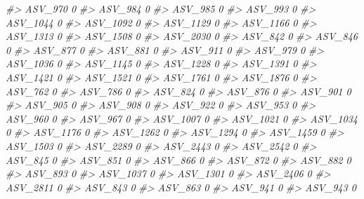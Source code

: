 \documentclass[
]{article}
\newenvironment{Shaded}{\begin{snugshade}}{\end{snugshade}}
\newcommand{\CommentTok}[1]{\textcolor[rgb]{0.56,0.35,0.01}{\textit{#1}}}
\begin{document}
\begin{Shaded}
\begin{Highlighting}[]
\CommentTok{\#\textgreater{} ASV\_970   0}
\CommentTok{\#\textgreater{} ASV\_984   0}
\CommentTok{\#\textgreater{} ASV\_985   0}
\CommentTok{\#\textgreater{} ASV\_993   0}
\CommentTok{\#\textgreater{} ASV\_1044  0}
\CommentTok{\#\textgreater{} ASV\_1092  0}
\CommentTok{\#\textgreater{} ASV\_1129  0}
\CommentTok{\#\textgreater{} ASV\_1166  0}
\CommentTok{\#\textgreater{} ASV\_1313  0}
\CommentTok{\#\textgreater{} ASV\_1508  0}
\CommentTok{\#\textgreater{} ASV\_2030  0}
\CommentTok{\#\textgreater{} ASV\_842   0}
\CommentTok{\#\textgreater{} ASV\_846   0}
\CommentTok{\#\textgreater{} ASV\_877   0}
\CommentTok{\#\textgreater{} ASV\_881   0}
\CommentTok{\#\textgreater{} ASV\_911   0}
\CommentTok{\#\textgreater{} ASV\_979   0}
\CommentTok{\#\textgreater{} ASV\_1036  0}
\CommentTok{\#\textgreater{} ASV\_1145  0}
\CommentTok{\#\textgreater{} ASV\_1228  0}
\CommentTok{\#\textgreater{} ASV\_1391  0}
\CommentTok{\#\textgreater{} ASV\_1421  0}
\CommentTok{\#\textgreater{} ASV\_1521  0}
\CommentTok{\#\textgreater{} ASV\_1761  0}
\CommentTok{\#\textgreater{} ASV\_1876  0}
\CommentTok{\#\textgreater{} ASV\_762   0}
\CommentTok{\#\textgreater{} ASV\_786   0}
\CommentTok{\#\textgreater{} ASV\_824   0}
\CommentTok{\#\textgreater{} ASV\_876   0}
\CommentTok{\#\textgreater{} ASV\_901   0}
\CommentTok{\#\textgreater{} ASV\_905   0}
\CommentTok{\#\textgreater{} ASV\_908   0}
\CommentTok{\#\textgreater{} ASV\_922   0}
\CommentTok{\#\textgreater{} ASV\_953   0}
\CommentTok{\#\textgreater{} ASV\_960   0}
\CommentTok{\#\textgreater{} ASV\_967   0}
\CommentTok{\#\textgreater{} ASV\_1007  0}
\CommentTok{\#\textgreater{} ASV\_1021  0}
\CommentTok{\#\textgreater{} ASV\_1034  0}
\CommentTok{\#\textgreater{} ASV\_1176  0}
\CommentTok{\#\textgreater{} ASV\_1262  0}
\CommentTok{\#\textgreater{} ASV\_1294  0}
\CommentTok{\#\textgreater{} ASV\_1459  0}
\CommentTok{\#\textgreater{} ASV\_1503  0}
\CommentTok{\#\textgreater{} ASV\_2289  0}
\CommentTok{\#\textgreater{} ASV\_2443  0}
\CommentTok{\#\textgreater{} ASV\_2542  0}
\CommentTok{\#\textgreater{} ASV\_845   0}
\CommentTok{\#\textgreater{} ASV\_851   0}
\CommentTok{\#\textgreater{} ASV\_866   0}
\CommentTok{\#\textgreater{} ASV\_872   0}
\CommentTok{\#\textgreater{} ASV\_882   0}
\CommentTok{\#\textgreater{} ASV\_893   0}
\CommentTok{\#\textgreater{} ASV\_1037  0}
\CommentTok{\#\textgreater{} ASV\_1301  0}
\CommentTok{\#\textgreater{} ASV\_2406  0}
\CommentTok{\#\textgreater{} ASV\_2811  0}
\CommentTok{\#\textgreater{} ASV\_843   0}
\CommentTok{\#\textgreater{} ASV\_863   0}
\CommentTok{\#\textgreater{} ASV\_941   0}
\CommentTok{\#\textgreater{} ASV\_943   0}

\end{Highlighting}
\end{Shaded}
\end{document}
